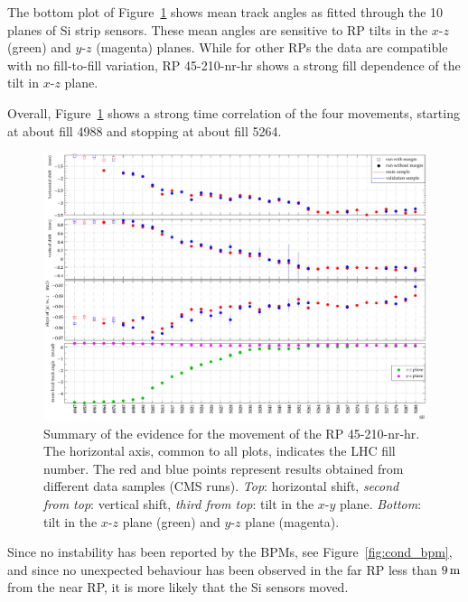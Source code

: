 \documentclass[TOTEM]{cern/cernphprep}
\def\un#1{\,{\rm #1}}
\begin{document}
The bottom plot of Figure~\ref{fig:left_near_summary} shows mean track angles as fitted through the 10 planes of Si strip sensors. These mean angles are sensitive to RP tilts in the $x$-$z$ (green) and $y$-$z$ (magenta) planes. While for other RPs the data are compatible with no fill-to-fill variation, RP 45-210-nr-hr shows a strong fill dependence of the tilt in $x$-$z$ plane.

Overall, Figure~\ref{fig:left_near_summary} shows a strong time correlation of the four movements, starting at about fill 4988 and stopping at about fill 5264.

\begin{figure}[h!]
\begin{center}
\includegraphics[width=1\hsize]{fig/physics_fills/45_210_nr_hr_summary.pdf}
\caption{%
Summary of the evidence for the movement of the RP 45-210-nr-hr. The horizontal axis, common to all plots, indicates the LHC fill number. The red and blue points represent results obtained from different data samples (CMS runs). {\it Top}: horizontal shift, {\it second from top}: vertical shift, {\it third from top}: tilt in the $x$-$y$ plane. {\it Bottom}: tilt in the $x$-$z$ plane (green) and $y$-$z$ plane (magenta).
}
\label{fig:left_near_summary}
\end{center}
\end{figure}

Since no instability has been reported by the BPMs, see Figure~\ref{fig:cond_bpm}, and since no unexpected behaviour has been observed in the far RP less than $9\un{m}$ from the near RP, it is more likely that the Si sensors moved.
\end{document}

